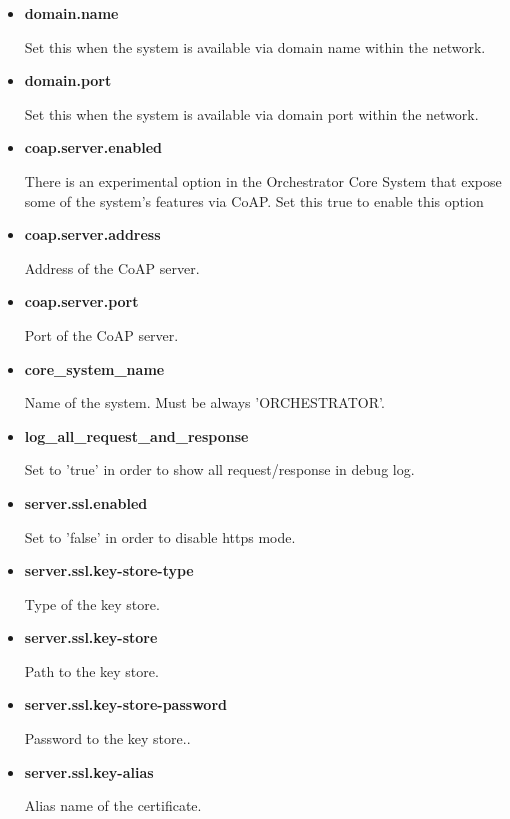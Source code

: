 \documentclass[a4paper]{arrowhead}
\begin{document}
\begin{itemize}
  \item \textbf{domain.name}
  
  Set this when the system is available via domain name within the network.
  
  \item \textbf{domain.port}
  
  Set this when the system is available via domain port within the network.

  \item \textbf{coap.server.enabled}

  There is an experimental option in the Orchestrator Core System that expose some of the system's features via CoAP. Set this true to enable this option

  \item \textbf{coap.server.address}

  Address of the CoAP server.

  \item \textbf{coap.server.port}

  Port of the CoAP server.
  
  \item \textbf{core\_system\_name}
  
  Name of the system. Must be always 'ORCHESTRATOR'.
  
  \item \textbf{log\_all\_request\_and\_response}
  
  Set to 'true' in order to show all request/response in debug log.
  
  \item \textbf{server.ssl.enabled}
  
  Set to 'false' in order to disable https mode.
  
  \item \textbf{server.ssl.key-store-type}
  
  Type of the key store.
  
  \item \textbf{server.ssl.key-store}
  
  Path to the key store.
  
  \item \textbf{server.ssl.key-store-password}
  
  Password to the key store..
  
  \item \textbf{server.ssl.key-alias}
  
  Alias name of the certificate.
  

\end{itemize}
\end{document}
